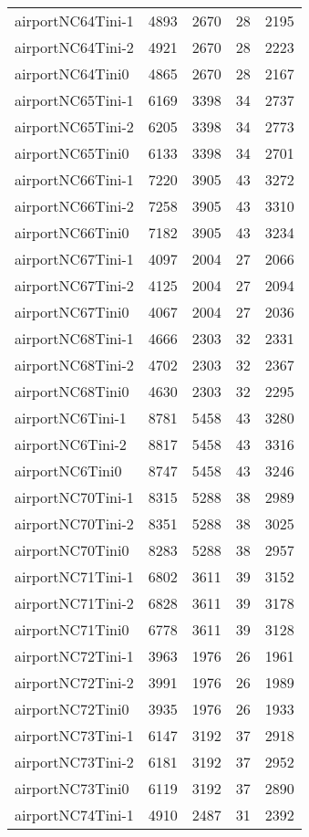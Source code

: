 \begin{longtable}{lrrrr}
airportNC64Tini-1 & 4893 & 2670 & 28 & 2195 \\
airportNC64Tini-2 & 4921 & 2670 & 28 & 2223 \\
airportNC64Tini0 & 4865 & 2670 & 28 & 2167 \\
airportNC65Tini-1 & 6169 & 3398 & 34 & 2737 \\
airportNC65Tini-2 & 6205 & 3398 & 34 & 2773 \\
airportNC65Tini0 & 6133 & 3398 & 34 & 2701 \\
airportNC66Tini-1 & 7220 & 3905 & 43 & 3272 \\
airportNC66Tini-2 & 7258 & 3905 & 43 & 3310 \\
airportNC66Tini0 & 7182 & 3905 & 43 & 3234 \\
airportNC67Tini-1 & 4097 & 2004 & 27 & 2066 \\
airportNC67Tini-2 & 4125 & 2004 & 27 & 2094 \\
airportNC67Tini0 & 4067 & 2004 & 27 & 2036 \\
airportNC68Tini-1 & 4666 & 2303 & 32 & 2331 \\
airportNC68Tini-2 & 4702 & 2303 & 32 & 2367 \\
airportNC68Tini0 & 4630 & 2303 & 32 & 2295 \\
airportNC6Tini-1 & 8781 & 5458 & 43 & 3280 \\
airportNC6Tini-2 & 8817 & 5458 & 43 & 3316 \\
airportNC6Tini0 & 8747 & 5458 & 43 & 3246 \\
airportNC70Tini-1 & 8315 & 5288 & 38 & 2989 \\
airportNC70Tini-2 & 8351 & 5288 & 38 & 3025 \\
airportNC70Tini0 & 8283 & 5288 & 38 & 2957 \\
airportNC71Tini-1 & 6802 & 3611 & 39 & 3152 \\
airportNC71Tini-2 & 6828 & 3611 & 39 & 3178 \\
airportNC71Tini0 & 6778 & 3611 & 39 & 3128 \\
airportNC72Tini-1 & 3963 & 1976 & 26 & 1961 \\
airportNC72Tini-2 & 3991 & 1976 & 26 & 1989 \\
airportNC72Tini0 & 3935 & 1976 & 26 & 1933 \\
airportNC73Tini-1 & 6147 & 3192 & 37 & 2918 \\
airportNC73Tini-2 & 6181 & 3192 & 37 & 2952 \\
airportNC73Tini0 & 6119 & 3192 & 37 & 2890 \\
airportNC74Tini-1 & 4910 & 2487 & 31 & 2392 \\

\end{longtable}

